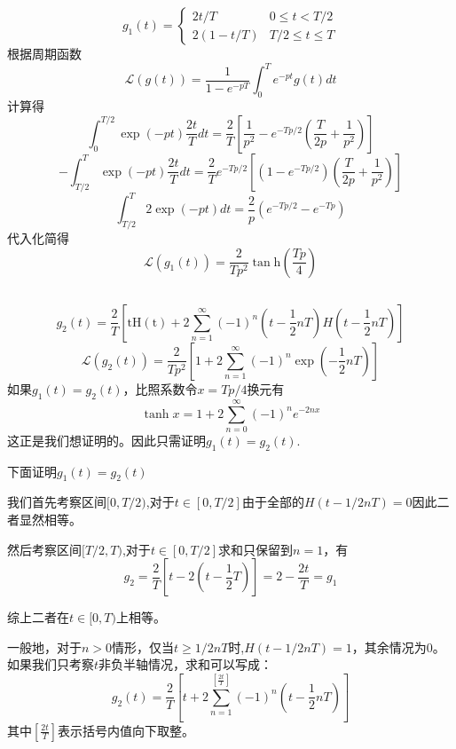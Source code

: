 \documentclass[a4paper]{ctexart}
\begin{document}
\subsection{}
$$
    g_1(t)=\left\{\begin{array}{cc}
        2 t / T    & 0 \leq t<T / 2      \\
        2(1-t / T) & T / 2 \leq t \leq T
    \end{array}\right.
$$
根据周期函数
$$
    \mathcal{L}\left( g\left( t \right) \right) =
    \frac{1}{1-e^{-p T}} \int_{0}^{T} e^{-p t} g(t) d t
$$
计算得
$$
    \int_0^{T/2}{\exp \left( -pt \right) \frac{2t}{T}dt=\frac{2}{T}}\left[ \frac{1}{p^2}-e^{-Tp/2}\left( \frac{T}{2p}+\frac{1}{p^2} \right) \right]
$$
$$
    -\int_{T/2}^T{\exp \left( -pt \right) \frac{2t}{T}dt=\frac{2}{T}}e^{-Tp/2}\left[ \left( 1-e^{-Tp/2} \right) \left( \frac{T}{2p}+\frac{1}{p^2} \right) \right]
$$
$$
    \int_{T/2}^T{2\exp \left( -pt \right) dt=\frac{2}{p}}\left( e^{-Tp/2}-e^{-Tp} \right)
$$
代入化简得
$$
    \mathcal{L}\left( g_1\left( t \right) \right) =\frac{2}{Tp^2}\tan\text{h}\left( \frac{Tp}{4} \right)
$$
\subsection{}
$$
    g_2\left( t \right) =\frac{2}{T}\left[ \text{tH}\left( \text{t} \right) +2\sum_{n=1}^{\infty}{\left( -1 \right)}^n\left( t-\frac{1}{2}nT \right) H\left( t-\frac{1}{2}nT \right) \right]
$$
$$
    \mathcal{L}\left( g_2\left( t \right) \right) =\frac{2}{Tp^2}\left[ 1+2\sum_{n=1}^{\infty}{\left( -1 \right)}^n\exp \left( -\frac{1}{2}nT \right) \right]
$$
如果$g_1(t)=g_2(t)$，比照系数令$x=Tp/4$换元有
$$
    \tanh x=1+2 \sum_{n=0}^{\infty}(-1)^{n} e^{-2 n x}
$$
这正是我们想证明的。因此只需证明$g_1(t)=g_2(t)$.

下面证明$g_1(t)=g_2(t)$

我们首先考察区间$[0,T/2)$,对于$t\in [0,T/2]$由于全部的$H(t-1/2nT)=0$因此二者显然相等。

然后考察区间$[T/2,T)$,对于$t\in [0,T/2]$求和只保留到$n=1$，有
$$
    g_2=\frac{2}{T}\left[ t-2\left( t-\frac{1}{2}T \right) \right] =2-\frac{2t}{T}=g_1
$$

综上二者在$t\in [0,T)$上相等。

一般地，对于$n>0$情形，仅当$t\geq 1/2nT$时,$H(t-1/2nT)=1$，其余情况为0。如果我们只考察$t$非负半轴情况，求和可以写成：
$$
    g_2\left( t \right) =\frac{2}{T}\left[ t +2\sum_{n=1}^{\left[ \frac{2t}{T} \right]}{\left( -1 \right)}^n\left( t-\frac{1}{2}nT \right) \right]
$$
其中$\left[ \frac{2t}{T} \right]$表示括号内值向下取整。
\end{document}
